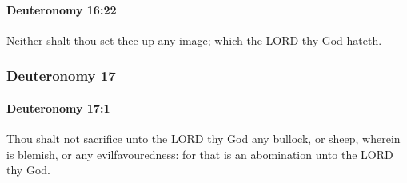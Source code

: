 		\paragraph{Deuteronomy 16:22} %
			\label{DEUTERONOMY-16-22}

			Neither shalt thou set thee up any image; which the LORD thy God hateth.

	\subsubsection{Deuteronomy 17} %
		\label{DEUTERONOMY-17}

		\paragraph{Deuteronomy 17:1} %
			\label{DEUTERONOMY-17-1}

			Thou shalt not sacrifice unto the LORD thy God any bullock, or sheep, wherein is blemish, or any evilfavouredness: for that is an abomination unto the LORD thy God.

